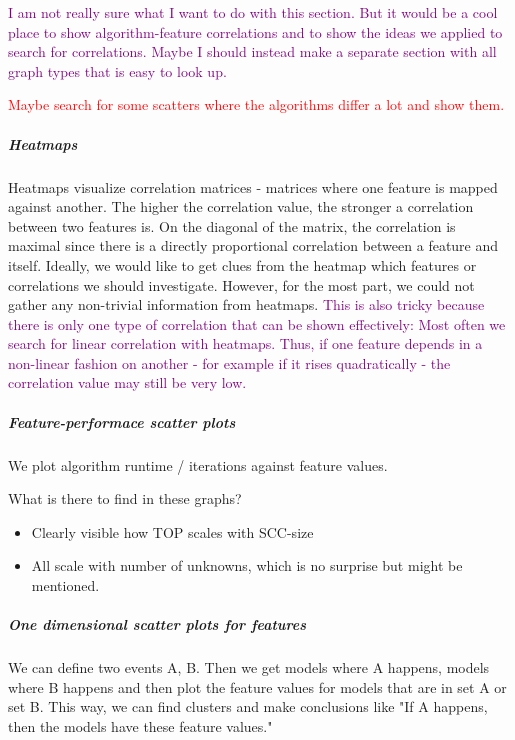 \textcolor{purple}{I am not really sure what I want to do with this section. 
But it would be a cool place to show algorithm-feature correlations and to show the ideas we applied to search for correlations.
Maybe I should instead make a separate section with all graph types that is easy to look up.}

\textcolor{red}{Maybe search for some scatters where the algorithms differ a lot and show them.}

\subparagraph*{Heatmaps}
Heatmaps visualize correlation matrices - matrices where one feature is mapped against another. The higher the correlation value, the stronger
a correlation between two features is. On the diagonal of the matrix, the correlation is maximal since there is a directly proportional correlation between
a feature and itself. Ideally, we would like to get clues from the heatmap which features or correlations we should investigate.
However, for the most part, we could not gather any non-trivial information from heatmaps. \textcolor{purple}{This is also tricky because
there is only one type of correlation that can be shown effectively: Most often we search for linear correlation with heatmaps. Thus,
if one feature depends in a non-linear fashion on another - for example if it rises quadratically - the correlation value may still be very low.}

\subparagraph*{Feature-performace scatter plots}
We plot algorithm runtime / iterations against feature values.

What is there to find in these graphs?
\begin{itemize}
    \item Clearly visible how TOP scales with SCC-size
    \item All scale with number of unknowns, which is no surprise but might be mentioned.
\end{itemize}

\subparagraph*{One dimensional scatter plots for features}
We can define two events A, B. Then we get models where A happens, models where B happens and then plot the feature values for models that are in set A or set B.
This way, we can find clusters and make conclusions like "If A happens, then the models have these feature values."
\fi